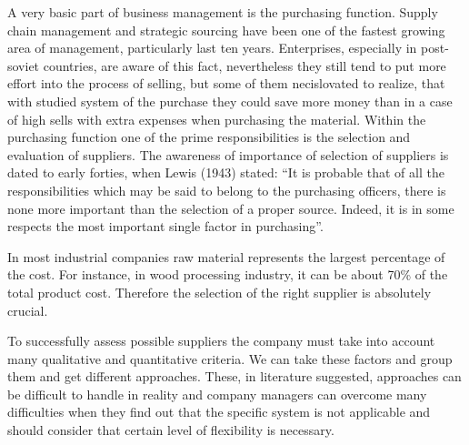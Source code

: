\documentclass[oneside,12pt]{article}%
\begin{document}
A very basic part of business management is the purchasing function. Supply chain management and strategic sourcing have been one of the fastest growing area of management, particularly last ten years. Enterprises, especially in post-soviet countries, are aware of this fact, nevertheless they still tend to put more effort into the process of selling, but some of them necislovated to realize, that with studied system of the purchase they could save more money than in a case of high sells with extra expenses when purchasing the material. Within the purchasing function one of the prime responsibilities is the selection and evaluation of suppliers. The awareness of importance of selection of suppliers is dated to early forties, when Lewis (1943) stated: “It is probable that of all the responsibilities which may be said to belong to the purchasing officers, there is none more important than the selection of a proper source. Indeed, it is in some respects the most important single factor in purchasing”. \par
In most industrial companies raw material represents the largest percentage of the cost. For instance, in wood processing industry, it can be about 70\% of the total product cost. Therefore the selection of the right supplier is absolutely crucial.\par
To successfully assess possible suppliers the company must take into account many qualitative and quantitative criteria. We can take these factors and group them and get different approaches. These, in literature suggested, approaches can be difficult to handle in reality and company managers can overcome many difficulties when they find out that the specific system is not applicable and should consider that certain level of flexibility is necessary.



\begin{table}
  \caption{popis}
\end{table}
\end{document}
